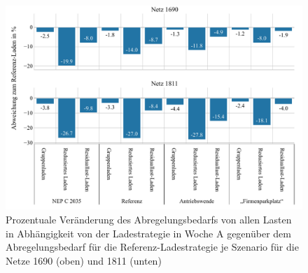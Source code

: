 \begin{figure}[H]
    \centering
    \includegraphics[width=\textwidth]{Bilder/1690_1811_cur_load_grid_week_A}
    \caption{Prozentuale Veränderung des Abregelungsbedarfs von allen Lasten in Abhängigkeit von der Ladestrategie in Woche A gegenüber dem Abregelungsbedarf für die Referenz-Ladestrategie je Szenario für die Netze \num{1690} (oben) und \num{1811} (unten)}\label{fig:1690_1811_cur_load_grid_week_A}
\end{figure}